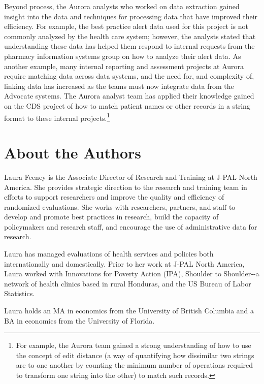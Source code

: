 \documentclass[
]{book}
\begin{document}
Beyond process, the Aurora analysts who worked on data extraction gained insight into the data and techniques for processing data that have improved their efficiency. For example, the best practice alert data used for this project is not commonly analyzed by the health care system; however, the analysts stated that understanding these data has helped them respond to internal requests from the pharmacy information systems group on how to analyze their alert data. As another example, many internal reporting and assessment projects at Aurora require matching data across data systems, and the need for, and complexity of, linking data has increased as the teams must now integrate data from the Advocate systems. The Aurora analyst team has applied their knowledge gained on the CDS project of how to match patient names or other records in a string format to these internal projects.\footnote{For example, the Aurora team gained a strong understanding of how to use the concept of edit distance (a way of quantifying how dissimilar two strings are to one another by counting the minimum number of operations required to transform one string into the other) to match such records.}

\hypertarget{about-the-authors-4}{%
\section*{About the Authors}\label{about-the-authors-4}}

Laura Feeney is the Associate Director of Research and Training at J-PAL North America. She provides strategic direction to the research and training team in efforts to support researchers and improve the quality and efficiency of randomized evaluations. She works with researchers, partners, and staff to develop and promote best practices in research, build the capacity of policymakers and research staff, and encourage the use of administrative data for research.

Laura has managed evaluations of health services and policies both internationally and domestically. Prior to her work at J-PAL North America, Laura worked with Innovations for Poverty Action (IPA), Shoulder to Shoulder-\/-a network of health clinics based in rural Honduras, and the US Bureau of Labor Statistics.

Laura holds an MA in economics from the University of British Columbia and a BA in economics from the University of Florida.
\end{document}
